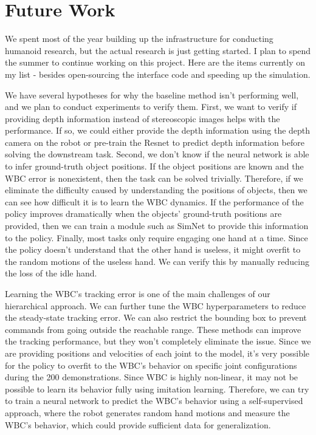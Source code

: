 \chapter{Future Work}

We spent most of the year building up the infrastructure for conducting humanoid research, but the actual research is just getting started. I plan to spend the summer to continue working on this project. Here are the items currently on my list - besides open-sourcing the interface code and speeding up the simulation. 

We have several hypotheses for why the baseline method isn't performing well, and we plan to conduct experiments to verify them. First, we want to verify if providing depth information instead of stereoscopic images helps with the performance. If so, we could either provide the depth information using the depth camera on the robot or pre-train the Resnet to predict depth information before solving the downstream task. Second, we don't know if the neural network is able to infer ground-truth object positions. If the object positions are known and the WBC error is nonexistent, then the task can be solved trivially. Therefore, if we eliminate the difficulty caused by understanding the positions of objects, then we can see how difficult it is to learn the WBC dynamics. If the performance of the policy improves dramatically when the objects' ground-truth positions are provided, then we can train a module such as SimNet \cite{kollar2021simnet} to provide this information to the policy. Finally, most tasks only require engaging one hand at a time. Since the policy doesn't understand that the other hand is useless, it might overfit to the random motions of the useless hand. We can verify this by manually reducing the loss of the idle hand. 

Learning the WBC's tracking error is one of the main challenges of our hierarchical approach. We can further tune the WBC hyperparameters to reduce the steady-state tracking error. We can also restrict the bounding box to prevent commands from going outside the reachable range. These methods can improve the tracking performance, but they won't completely eliminate the issue. Since we are providing positions and velocities of each joint to the model, it's very possible for the policy to overfit to the WBC's behavior on specific joint configurations during the 200 demonstrations. Since WBC is highly non-linear, it may not be possible to learn its behavior fully using imitation learning. Therefore, we can try to train a neural network to predict the WBC's behavior using a self-supervised approach, where the robot generates random hand motions and measure the WBC's behavior, which could provide sufficient data for generalization. 


